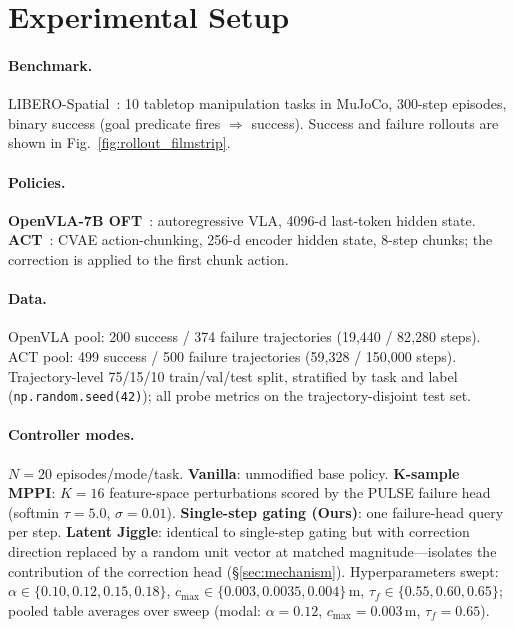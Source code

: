 \section{Experimental Setup}
\label{sec:experimental_setup}

\paragraph{Benchmark.} LIBERO-Spatial~\citep{libero_paper}: 10 tabletop manipulation tasks in MuJoCo, 300-step episodes, binary success (goal predicate fires $\Rightarrow$ success). Success and failure rollouts are shown in Fig.~\ref{fig:rollout_filmstrip}.

\paragraph{Policies.} \textbf{OpenVLA-7B OFT}~\citep{openvla_paper}: autoregressive VLA, 4096-d last-token hidden state. \textbf{ACT}~\citep{act_paper}: CVAE action-chunking, 256-d encoder hidden state, 8-step chunks; the correction is applied to the first chunk action.

\paragraph{Data.} OpenVLA pool: 200 success / 374 failure trajectories (19{,}440 / 82{,}280 steps). ACT pool: 499 success / 500 failure trajectories (59{,}328 / 150{,}000 steps). Trajectory-level 75/15/10 train/val/test split, stratified by task and label (\texttt{np.random.seed(42)}); all probe metrics on the trajectory-disjoint test set.

\paragraph{Controller modes.} $N{=}20$ episodes/mode/task. \textbf{Vanilla}: unmodified base policy. \textbf{K-sample MPPI}: $K{=}16$ feature-space perturbations scored by the PULSE failure head (softmin $\tau{=}5.0$, $\sigma{=}0.01$). \textbf{Single-step gating (Ours)}: one failure-head query per step. \textbf{Latent Jiggle}: identical to single-step gating but with correction direction replaced by a random unit vector at matched magnitude---isolates the contribution of the correction head (\S\ref{sec:mechanism}). Hyperparameters swept: $\alpha \in \{0.10, 0.12, 0.15, 0.18\}$, $c_{\max} \in \{0.003, 0.0035, 0.004\}$\,m, $\tau_f \in \{0.55, 0.60, 0.65\}$; pooled table averages over sweep (modal: $\alpha{=}0.12$, $c_{\max}{=}0.003$\,m, $\tau_f{=}0.65$).

